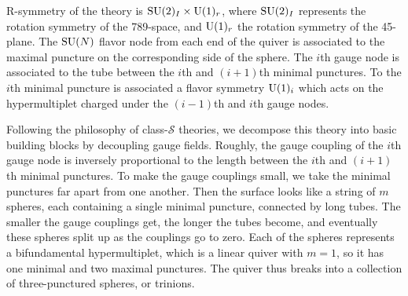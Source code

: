 R-symmetry of the theory is $\mathrm{SU}(2)_{I} \times \mathrm{U}(1)_{r}$, where $\mathrm{SU}(2)_{I}$
represents the rotation symmetry of the 789-space, and $\mathrm{U}(1)_{r}$
the rotation symmetry of the 45-plane. The $\mathrm{SU}(N)$ flavor node from
each end of the quiver is associated to the maximal puncture on the
corresponding side of the sphere. The $i$th gauge node is associated
to the tube between the $i$th and $(i+1)$th minimal punctures. To
the $i$th minimal puncture is associated a flavor symmetry $\mathrm{U}(1)_{i}$
which acts on the hypermultiplet charged under the $(i-1)$th and
$i$th gauge nodes.

Following the philosophy of class-$\mathcal{S}$ theories, we decompose
this theory into basic building blocks by decoupling gauge fields.
Roughly, the gauge coupling of the $i$th gauge node is inversely
proportional to the length between the $i$th and $(i+1)$th minimal
punctures. To make the gauge couplings small, we take the minimal
punctures far apart from one another. Then the surface looks like
a string of $m$ spheres, each containing a single minimal puncture,
connected by long tubes. The smaller the gauge couplings get, the
longer the tubes become, and eventually these spheres split up as
the couplings go to zero. Each of the spheres represents a bifundamental
hypermultiplet, which is a linear quiver with $m=1$, so it has one
minimal and two maximal punctures. The quiver thus breaks into a collection
of three-punctured spheres, or trinions.


